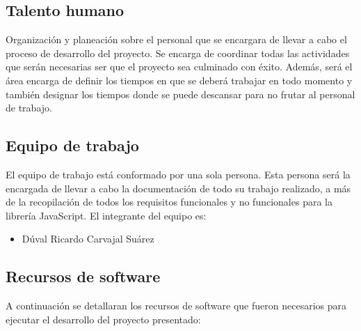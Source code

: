\subsection{Talento humano}

Organización y planeación sobre el personal que se encargara de llevar a cabo el proceso de desarrollo del proyecto. Se encarga de coordinar todas las actividades que serán necesarias ser que el proyecto sea culminado con éxito. Además, será el área encarga de definir los tiempos en que se deberá trabajar en todo momento y también designar los tiempos donde se puede descansar para no frutar al personal de trabajo.

\subsection{Equipo de trabajo}

El equipo de trabajo está conformado por una sola persona. Esta persona será la encargada de llevar a cabo la documentación de todo su trabajo realizado, a más de la recopilación de todos los requisitos funcionales y no funcionales para la librería JavaScript. El integrante del equipo es:

\begin{itemize}
	\item Dúval Ricardo Carvajal Suárez
\end{itemize} 

\subsection{Recursos de software}

A continuación se detallaran los recursos de software que fueron necesarios para ejecutar el desarrollo del proyecto presentado:


